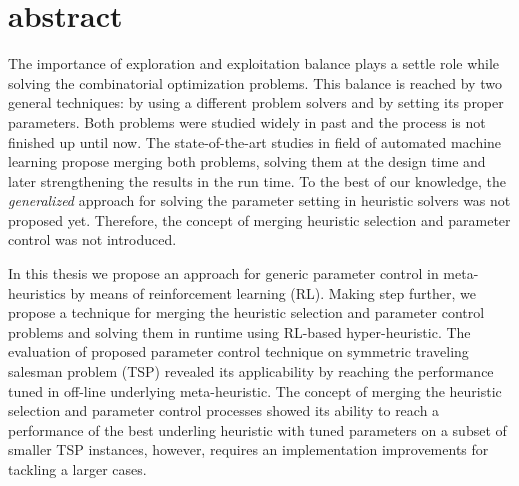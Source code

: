 \section*{abstract}
The importance of exploration and exploitation balance plays a settle role while solving the combinatorial optimization problems. This balance is reached by two general techniques: by using a different problem solvers and by setting its proper parameters. Both problems were studied widely in past and the process is not finished up until now. The state-of-the-art studies in field of automated machine learning propose merging both problems, solving them at the design time and later strengthening the results in the run time. To the best of our knowledge, the \emph{generalized} approach for solving the parameter setting in heuristic solvers was not proposed yet. Therefore, the concept of merging heuristic selection and parameter control was not introduced.

In this thesis we propose an approach for generic parameter control in meta-heuristics by means of reinforcement learning (RL). Making step further, we propose a technique for merging the heuristic selection and parameter control problems and solving them in runtime using RL-based hyper-heuristic. The evaluation of proposed parameter control technique on symmetric traveling salesman problem (TSP) revealed its applicability by reaching the performance tuned in off-line underlying meta-heuristic. The concept of merging the heuristic selection and parameter control processes showed its ability to reach a performance of the best underling heuristic with tuned parameters on a subset of smaller TSP instances, however, requires an implementation improvements for tackling a larger cases.